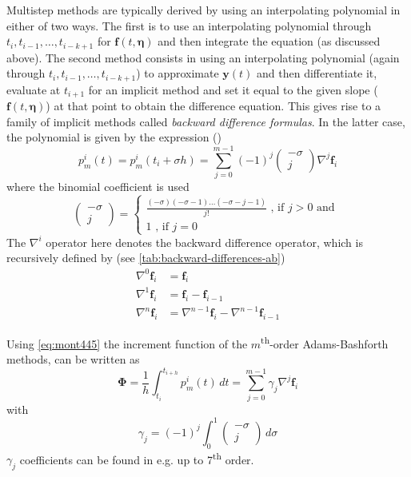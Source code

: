 Multistep methods are typically derived by using an interpolating polynomial in
either of two ways. The first is to use an interpolating polynomial through 
$t_i, t_{i-1}, \dots , t_{i-k+1}$ for $\bm{f}(t, \bm{\eta})$ and then integrate 
the equation (as discussed above). The second method consists in using an 
interpolating polynomial (again through $t_i, t_{i-1}, \dots , t_{i-k+1}$) to 
approximate $\bm{y}(t)$ and then differentiate it, evaluate at $t_{i+1}$ for an 
implicit method and set it equal to the given slope ($\bm{f}(t, \bm{\eta})$) at 
that point to obtain the difference equation. This gives rise to a family of 
implicit methods called \emph{backward difference formulas}. In the latter case, 
the polynomial is given by the expression (\cite{Montenbruck2000})
\begin{equation}\label{eq:mont451}
    p^{i}_{m}(t) = p^{i}_{m}(t_i + \sigma h) = \sum_{j=0}^{m-1} \left(-1\right)^j 
        \begin{pmatrix}-\sigma \\ j \end{pmatrix} \nabla ^j \bm{f}_i
\end{equation}
where the binomial coefficient is used
\begin{equation}
    \begin{pmatrix}-\sigma \\ j \end{pmatrix} = 
        \begin{cases}
            \frac{(-\sigma)(-\sigma -1)\dots (-\sigma -j -1)}{j!} \text{ , if } j>0 \text{ and } \\
            1  \text{ , if } j=0
        \end{cases}
\end{equation}
The $\nabla ^i$ operator here denotes the backward difference operator, which is 
recursively defined by (see \autoref{tab:backward-differences-ab})
\begin{equation}
    \begin{aligned}
        \nabla ^0 \bm{f}_i &= \bm{f}_i \\
        \nabla ^1 \bm{f}_i &= \bm{f}_i - \bm{f}_{i-1} \\
        \nabla ^n \bm{f}_i &= \nabla ^{n-1}\bm{f}_i - \nabla ^{n-1} \bm{f}_{i-1}
    \end{aligned}
\end{equation}

Using \autoref{eq:mont445} the increment function of the $m$\textsuperscript{th}-order 
Adams-Bashforth methods, can be written as
\begin{equation}\label{eq:mont454}
    \bm{\Phi} = \frac{1}{h} \int_{t_i}^{t_{i+h}} p^{i}_{m}(t) \,dt 
        = \sum_{j=0}^{m-1} \gamma _j \nabla ^j \bm{f}_i
\end{equation}
with 
\begin{equation}\label{eq:mont455}
    \gamma _j = \left( -1 \right)^j \int_{0}^{1} \begin{pmatrix}-\sigma \\ j \end{pmatrix} \,d\sigma
\end{equation}
$\gamma _j$ coefficients can be found in e.g. \cite{Butcher2016} up to 
7\textsuperscript{th} order.

